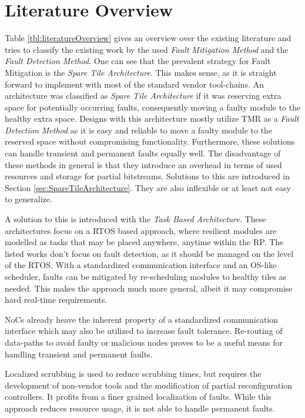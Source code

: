 \section{Literature Overview}\label{sec:literatureOverview}
Table \ref{tbl:literatureOverview} gives an overview over the existing literature and tries to classify the existing work by the used \textit{Fault Mitigation Method} and the \textit{Fault Detection Method}.
One can see that the prevalent strategy for Fault Mitigation is the \textit{Spare Tile Architecture}. 
This makes sense, as it is straight forward to implement with most of the standard vendor tool-chains.
An architecture was classified as \textit{Spare Tile Architecture} if it was reserving extra space for potentially occurring faults, consequently moving a faulty module to the healthy extra space.
Designs with this architecture mostly utilize \gls{TMR} as a \textit{Fault Detection Method} as it is easy and reliable to move a faulty module to the reserved space without compromising functionality.
Furthermore, these solutions can handle transient and permanent faults equally well.
The disadvantage of these methods in general is that they introduce an overhead in terms of used resources and storage for partial bitstreams.
Solutions to this are introduced in Section \ref{sec:SpareTileArchitecture}. 
They are also inflexible or at least not easy to generalize.

A solution to this is introduced with the \textit{Task Based Architecture}.
These architectures focus on a \gls{RTOS} based approach, where resilient modules are modelled as tasks that may be placed anywhere, anytime within the \gls{RP}. 
The listed works don't focus on fault detection, as it should be managed on the level of the \gls{RTOS}.
With a standardized communication interface and an OS-like scheduler, faults can be mitigated by re-scheduling modules to healthy tiles as needed. 
This makes the approach much more general, albeit it may compromise hard real-time requirements.

\glspl{NoC} already heave the inherent property of a standardized communication interface which may also be utilized to increase fault tolerance.
Re-routing of data-paths to avoid faulty or malicious nodes proves to be a useful means for handling transient and permanent faults.

Localized scrubbing is used to reduce scrubbing times, but requires the development of non-vendor tools and the modification of partial reconfiguration controllers.
It profits from a finer grained localization of faults.
While this approach reduces resource usage, it is not able to handle permanent faults. 

